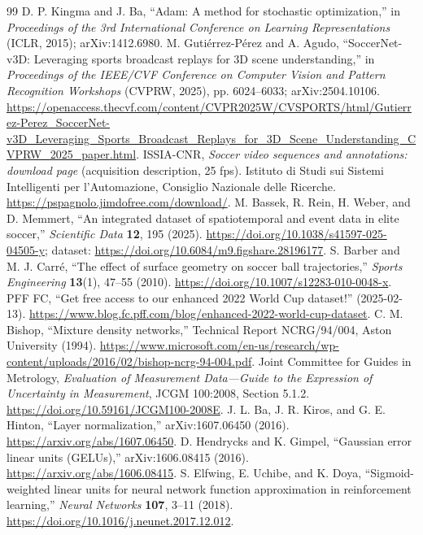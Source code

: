 \documentclass[11pt,a4paper]{article}
\begin{document}
\begin{thebibliography}{99}
 D. P. Kingma and J. Ba, ``Adam: A method for stochastic optimization,'' in \emph{Proceedings of the 3rd International Conference on Learning Representations} (ICLR, 2015); arXiv:1412.6980.
 M. Guti\'errez-P\'erez and A. Agudo, ``SoccerNet-v3D: Leveraging sports broadcast replays for 3D scene understanding,'' in \emph{Proceedings of the IEEE/CVF Conference on Computer Vision and Pattern Recognition Workshops} (CVPRW, 2025), pp. 6024--6033; arXiv:2504.10106. \url{https://openaccess.thecvf.com/content/CVPR2025W/CVSPORTS/html/Gutierrez-Perez_SoccerNet-v3D_Leveraging_Sports_Broadcast_Replays_for_3D_Scene_Understanding_CVPRW_2025_paper.html}.
 ISSIA-CNR, \emph{Soccer video sequences and annotations: download page} (acquisition description, 25 fps). Istituto di Studi sui Sistemi Intelligenti per l'Automazione, Consiglio Nazionale delle Ricerche. \url{https://pspagnolo.jimdofree.com/download/}.
 M. Bassek, R. Rein, H. Weber, and D. Memmert, ``An integrated dataset of spatiotemporal and event data in elite soccer,'' \emph{Scientific Data} \textbf{12}, 195 (2025). \url{https://doi.org/10.1038/s41597-025-04505-y}; dataset: \url{https://doi.org/10.6084/m9.figshare.28196177}.
 S. Barber and M. J. Carr\'e, ``The effect of surface geometry on soccer ball trajectories,'' \emph{Sports Engineering} \textbf{13}(1), 47--55 (2010). \url{https://doi.org/10.1007/s12283-010-0048-x}.
 PFF FC, ``Get free access to our enhanced 2022 World Cup dataset!'' (2025-02-13). \url{https://www.blog.fc.pff.com/blog/enhanced-2022-world-cup-dataset}.
 C. M. Bishop, ``Mixture density networks,'' Technical Report NCRG/94/004, Aston University (1994). \url{https://www.microsoft.com/en-us/research/wp-content/uploads/2016/02/bishop-ncrg-94-004.pdf}.
 Joint Committee for Guides in Metrology, \emph{Evaluation of Measurement Data---Guide to the Expression of Uncertainty in Measurement}, JCGM 100:2008, Section 5.1.2. \url{https://doi.org/10.59161/JCGM100-2008E}.
 J. L. Ba, J. R. Kiros, and G. E. Hinton, ``Layer normalization,'' arXiv:1607.06450 (2016). \url{https://arxiv.org/abs/1607.06450}.
 D. Hendrycks and K. Gimpel, ``Gaussian error linear units (GELUs),'' arXiv:1606.08415 (2016). \url{https://arxiv.org/abs/1606.08415}.
 S. Elfwing, E. Uchibe, and K. Doya, ``Sigmoid-weighted linear units for neural network function approximation in reinforcement learning,'' \emph{Neural Networks} \textbf{107}, 3--11 (2018). \url{https://doi.org/10.1016/j.neunet.2017.12.012}.

\end{thebibliography}
\end{document}

